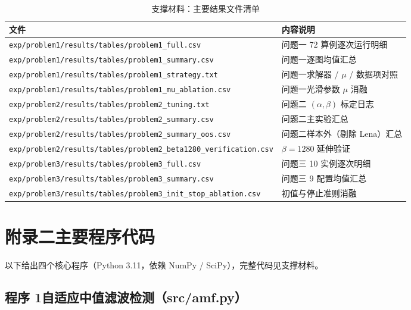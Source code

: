 \documentclass[withoutpreface,bwprint]{cumcmthesis}
\begin{document}
\begin{table}[!htbp]
  \centering\small
  \caption{支撑材料：主要结果文件清单}
  \label{tab:results}
  \begin{tabular}{ll}
    \toprule[1.5pt]
    文件 & 内容说明 \\
    \midrule[1pt]
    \texttt{exp/problem1/results/tables/problem1\_full.csv} & 问题一 72 算例逐次运行明细 \\
    \texttt{exp/problem1/results/tables/problem1\_summary.csv} & 问题一逐图均值汇总 \\
    \texttt{exp/problem1/results/tables/problem1\_strategy.txt} & 问题一求解器 / $\mu$ / 数据项对照 \\
    \texttt{exp/problem1/results/tables/problem1\_mu\_ablation.csv} & 问题一光滑参数 $\mu$ 消融 \\
    \texttt{exp/problem2/results/tables/problem2\_tuning.txt} & 问题二 $(\alpha,\beta)$ 标定日志 \\
    \texttt{exp/problem2/results/tables/problem2\_summary.csv} & 问题二主实验汇总 \\
    \texttt{exp/problem2/results/tables/problem2\_summary\_oos.csv} & 问题二样本外（剔除 Lena）汇总 \\
    \texttt{exp/problem2/results/tables/problem2\_beta1280\_verification.csv} & $\beta=1280$ 延伸验证 \\
    \texttt{exp/problem3/results/tables/problem3\_full.csv} & 问题三 10 实例逐次明细 \\
    \texttt{exp/problem3/results/tables/problem3\_summary.csv} & 问题三 9 配置均值汇总 \\
    \texttt{exp/problem3/results/tables/problem3\_init\_stop\_ablation.csv} & 初值与停止准则消融 \\
    \bottomrule[1.5pt]
  \end{tabular}
\end{table}

\section*{附录二\quad 主要程序代码}

以下给出四个核心程序（Python 3.11，依赖 NumPy / SciPy），完整代码见支撑材料。

\subsection*{程序 1\quad 自适应中值滤波检测（src/amf.py）}
\end{document}
